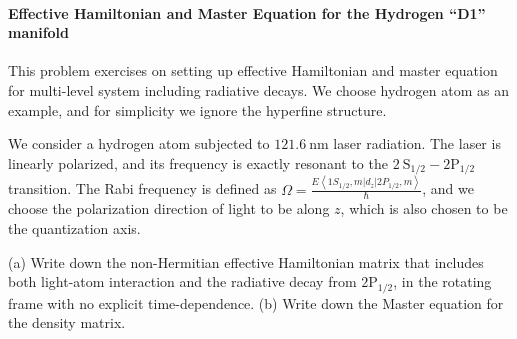 \documentclass[hyperref, a4paper]{article}
\begin{document}
\paragraph{Effective Hamiltonian and Master Equation for the Hydrogen ``D1'' manifold} 
This problem exercises on setting up effective Hamiltonian and master equation for multi-level system including radiative decays. We choose hydrogen atom as an example, and for simplicity we ignore the hyperfine structure.

We consider a hydrogen atom subjected to $121.6 \mathrm{~nm}$ laser radiation. The laser is linearly polarized, and its frequency is exactly resonant to the $2 \mathrm{~S}_{1 / 2}-2 \mathrm{P}_{1 / 2}$ transition. The Rabi frequency is defined as $\Omega=\frac{E\left\langle 1 S_{1 / 2}, m\left|d_{z}\right| 2 P_{1 / 2}, m\right\rangle}{\hbar}$, and we choose the polarization direction of light to be along $z$, which is also chosen to be the quantization axis.

(a) Write down the non-Hermitian effective Hamiltonian matrix that includes both light-atom interaction and the radiative decay from $2 \mathrm{P}_{1 / 2}$, in the rotating frame with no explicit time-dependence.
(b) Write down the Master equation for the density matrix.
\end{document}
